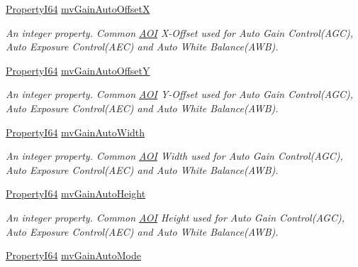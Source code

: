 \begin{DoxyCompactItemize}
\hyperlink{group___common_interface_ga81749b2696755513663492664a18a893}{Property\+I64} \hyperlink{classmv_i_m_p_a_c_t_1_1acquire_1_1_gen_i_cam_1_1_analog_control_aac47487b493423cf556dcb4b7e8ce53a}{mv\+Gain\+Auto\+Offset\+X}
\begin{DoxyCompactList}\small\item\em An integer property. Common \hyperlink{struct_a_o_i}{A\+O\+I} X-\/\+Offset used for Auto Gain Control(\+A\+G\+C), Auto Exposure Control(\+A\+E\+C) and Auto White Balance(\+A\+W\+B). \end{DoxyCompactList}\item 
\hyperlink{group___common_interface_ga81749b2696755513663492664a18a893}{Property\+I64} \hyperlink{classmv_i_m_p_a_c_t_1_1acquire_1_1_gen_i_cam_1_1_analog_control_ae532c8e928fd540e2429fbf4de09670a}{mv\+Gain\+Auto\+Offset\+Y}
\begin{DoxyCompactList}\small\item\em An integer property. Common \hyperlink{struct_a_o_i}{A\+O\+I} Y-\/\+Offset used for Auto Gain Control(\+A\+G\+C), Auto Exposure Control(\+A\+E\+C) and Auto White Balance(\+A\+W\+B). \end{DoxyCompactList}\item 
\hyperlink{group___common_interface_ga81749b2696755513663492664a18a893}{Property\+I64} \hyperlink{classmv_i_m_p_a_c_t_1_1acquire_1_1_gen_i_cam_1_1_analog_control_a8aa92ebc6e7feade0b09bb05c37e67ea}{mv\+Gain\+Auto\+Width}
\begin{DoxyCompactList}\small\item\em An integer property. Common \hyperlink{struct_a_o_i}{A\+O\+I} Width used for Auto Gain Control(\+A\+G\+C), Auto Exposure Control(\+A\+E\+C) and Auto White Balance(\+A\+W\+B). \end{DoxyCompactList}\item 
\hyperlink{group___common_interface_ga81749b2696755513663492664a18a893}{Property\+I64} \hyperlink{classmv_i_m_p_a_c_t_1_1acquire_1_1_gen_i_cam_1_1_analog_control_aac0a850e10f6d415785982d9fc991796}{mv\+Gain\+Auto\+Height}
\begin{DoxyCompactList}\small\item\em An integer property. Common \hyperlink{struct_a_o_i}{A\+O\+I} Height used for Auto Gain Control(\+A\+G\+C), Auto Exposure Control(\+A\+E\+C) and Auto White Balance(\+A\+W\+B). \end{DoxyCompactList}\item 
\hyperlink{group___common_interface_ga81749b2696755513663492664a18a893}{Property\+I64} \hyperlink{classmv_i_m_p_a_c_t_1_1acquire_1_1_gen_i_cam_1_1_analog_control_a896d827496c9bf28f115176b68b5ce27}{mv\+Gain\+Auto\+Mode}

\end{DoxyCompactItemize}
